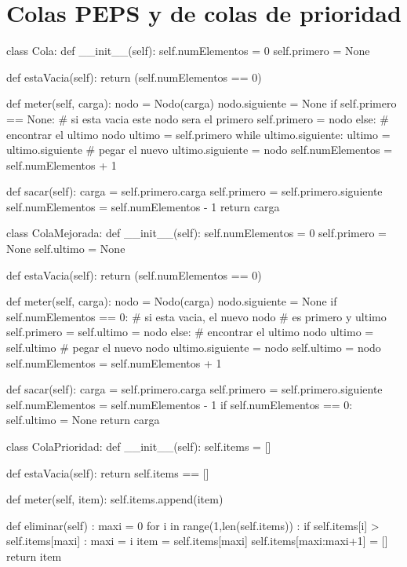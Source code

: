 \section{Colas PEPS y de colas de prioridad}

\begin{pythoncode}
class Cola:
  def __init__(self):
    self.numElementos = 0
    self.primero = None

  def estaVacia(self):
    return (self.numElementos == 0)

  def meter(self, carga):
    nodo = Nodo(carga) 
    nodo.siguiente = None
    if self.primero == None:
       # si esta vacia este nodo sera el primero
       self.primero = nodo
    else:
       # encontrar el ultimo nodo
       ultimo = self.primero
       while ultimo.siguiente:
     ultimo = ultimo.siguiente
     # pegar el nuevo
     ultimo.siguiente = nodo
       self.numElementos = self.numElementos + 1

  def sacar(self):
    carga = self.primero.carga
    self.primero = self.primero.siguiente
    self.numElementos = self.numElementos - 1
    return carga

class ColaMejorada:
  def __init__(self):
    self.numElementos = 0
    self.primero = None
    self.ultimo = None
        
  def estaVacia(self):
    return (self.numElementos == 0)

  def meter(self, carga):
    nodo = Nodo(carga) 
    nodo.siguiente = None
    if self.numElementos == 0:
      # si esta vacia, el nuevo nodo 
      # es primero y ultimo
      self.primero = self.ultimo = nodo
    else:
      # encontrar el ultimo nodo
      ultimo = self.ultimo
      # pegar el nuevo nodo
      ultimo.siguiente = nodo
      self.ultimo = nodo
      self.numElementos = self.numElementos + 1

    def sacar(self):
      carga = self.primero.carga
      self.primero = self.primero.siguiente
      self.numElementos = self.numElementos - 1
      if self.numElementos == 0:
        self.ultimo = None
      return carga

class ColaPrioridad:
  def __init__(self):
    self.items = []
      
  def estaVacia(self):
    return self.items == []
  
  def meter(self, item):
    self.items.append(item)

  def eliminar(self) :
    maxi = 0
    for i in range(1,len(self.items)) :
      if self.items[i] > self.items[maxi] :
    maxi = i
    item = self.items[maxi]
    self.items[maxi:maxi+1] = []
    return item


\end{pythoncode}
